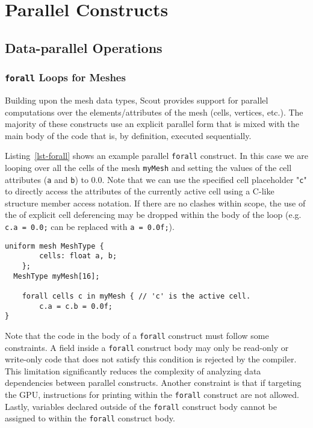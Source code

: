\let\clearforchapter\par %


\chapter{Parallel Constructs}

\section{Data-parallel Operations}

\subsection{\texttt{forall} Loops for Meshes}

Building upon the mesh data types, Scout provides support for parallel computations over the 
elements/attributes of the mesh (cells, vertices, etc.).  The majority of these constructs 
use an explicit parallel form that is mixed with the main body of the code that is, by 
definition, executed sequentially.  

Listing~\ref{lst-forall} shows an example parallel 
\texttt{forall} construct.  In this case we are looping over all the cells of the mesh 
\texttt{myMesh} and setting the values of the cell attributes (\texttt{a} and \texttt{b})
to $0.0$.  Note that we can use the specified cell placeholder "\texttt{c}" to directly
access the attributes of the currently active cell using a C-like structure member access
notation.  If there are no clashes within scope, the use of the of explicit cell deferencing
may be dropped within the body of the loop (e.g. \texttt{c.a = 0.0;} can be replaced with
\texttt{a = 0.0f;}).

\par\bigskip
\begin{lstlisting}[float=t,label=lst-forall,
	caption={A \texttt{forall} loop construct.}]
	uniform mesh MeshType {
		cells: float a, b;
	};
  MeshType myMesh[16];

	forall cells c in myMesh { // 'c' is the active cell.
		c.a = c.b = 0.0f;
}
\end{lstlisting}
\par\bigskip\noindent

Note that the code in the body of a \texttt{forall} construct must follow some
constraints.  A field inside a \texttt{forall} construct body may only be
read-only or write-only code that does not satisfy this condition is rejected by the compiler. 
This limitation significantly reduces the complexity of analyzing data dependencies between 
parallel constructs.  Another constraint is that if targeting the GPU, instructions for printing
within the \texttt{forall} construct are not allowed.  Lastly, variables declared outside
of the \texttt{forall} construct body cannot be assigned to within the \texttt{forall}
construct body.


